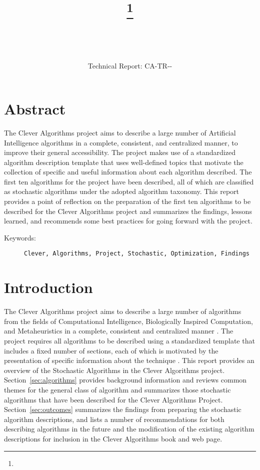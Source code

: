 \documentclass[a4paper, 11pt]{article}
\title{{\myreporttitle}\footnote{\myreportlicense}}
\author{\myreportauthor\\{\myreportemail}\\\small\myreportproject}
\date{\myreportfulldate\\{\small{Technical Report: CA-TR-{\myreportdate}-\myreportversion}}}
\begin{document}
\maketitle

\section*{Abstract} 
The Clever Algorithms project aims to describe a large number of Artificial Intelligence algorithms in a complete, consistent, and centralized manner, to improve their general accessibility. 
The project makes use of a standardized algorithm description template that uses well-defined topics that motivate the collection of specific and useful information about each algorithm described.
The first ten algorithms for the project have been described, all of which are classified as stochastic algorithms under the adopted algorithm taxonomy.
This report provides a point of reflection on the preparation of the first ten algorithms to be described for the Clever Algorithms project and summarizes the findings, lessons learned, and recommends some best practices for going forward with the project.

\begin{description}
	\item[Keywords:] {\small\texttt{Clever, Algorithms, Project, Stochastic, Optimization, Findings}}
\end{description} 

\section{Introduction}
\label{sec:introduction}
The Clever Algorithms project aims to describe a large number of algorithms from the fields of Computational Intelligence, Biologically Inspired Computation, and Metaheuristics in a complete, consistent and centralized manner \cite{Brownlee2010}.
The project requires all algorithms to be described using a standardized template that includes a fixed number of sections, each of which is motivated by the presentation of specific information about the technique \cite{Brownlee2010a}.
This report provides an overview of the Stochastic Algorithms in the Clever Algorithms project. 
Section~\ref{sec:algorithms} provides background information and reviews common themes for the general class of algorithm and summarizes those stochastic algorithms that have been described for the Clever Algorithms Project.
Section~\ref{sec:outcomes} summarizes the findings from preparing the stochastic algorithm descriptions, and lists a number of recommendations for both describing algorithms in the future and the modification of the existing algorithm descriptions for inclusion in the Clever Algorithms book and web page.
\end{document}

